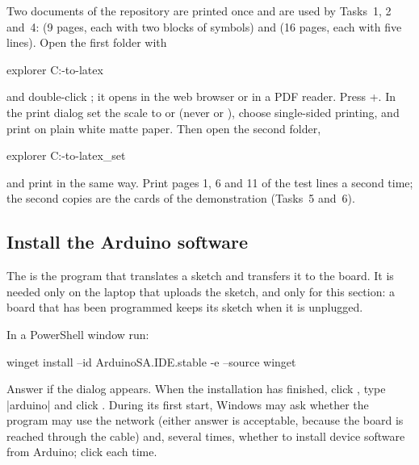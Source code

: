\label{st:print}
Two documents of the repository are printed once and are used by Tasks~1, 2 and~4:
 (9 pages, each with two blocks of symbols) and  (16
pages, each with five lines). Open the first folder with
\begin{ps}
explorer C:\camera-to-latex\sheets
\end{ps}
and double-click ; it opens in the web browser or in a PDF reader. Press
+. In the print dialog set the scale to  or 
(never  or ), choose single-sided printing, and print on plain
white matte paper. Then open the second folder,
\begin{ps}
explorer C:\camera-to-latex\test_set
\end{ps}
and print  in the same way. Print pages 1, 6 and 11 of the test lines a
second time; the second copies are the cards of the demonstration (Tasks~5 and~6).


\subsection{Install the Arduino software}

The  is the program that translates a sketch and transfers it to the board.
It is needed only on the laptop that uploads the sketch, and only for this section: a board
that has been programmed keeps its sketch when it is unplugged.

In a PowerShell window run:
\begin{ps}
winget install --id ArduinoSA.IDE.stable -e --source winget
\end{ps}
Answer  if the  dialog appears. When the installation has
finished, click , type \code|arduino| and click . During its first
start, Windows may ask whether the program may use the network (either answer is acceptable,
because the board is reached through the cable) and, several times, whether to install device
software from Arduino; click  each time.


